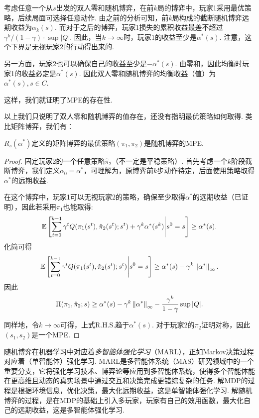考虑任意一个从$s$出发的双人零和随机博弈，在前$k$局的博弈中，玩家1采用最优策略，后续局面可选择任意动作. 由之前的分析可知，前$k$局构成的截断随机博弈远期收益为$\alpha_k(s)$. 而对于之后的博弈，玩家1损失的累积收益最差不超过$\gamma^k/(1-\gamma)\cdot \sup|Q|$. 因此，当$k\to\infty$时，玩家$1$的收益至少是$\alpha^*(s)$. 注意，这个下界是无视玩家2的行动得出来的.

另一方面，玩家2也可以确保自己的收益至少是$-\alpha^*(s)$. 由零和，因此均衡时玩家1的收益必定是$\alpha^*(s)$. 因此双人零和随机博弈的均衡收益（值）为$\alpha^*(s),s\in C$.

这样，我们就证明了MPE的存在性. 

以上我们只说明了双人零和随机博弈的值存在，还没有指明最优策略如何取得. 类比矩阵博弈，我们有：
\begin{theorem}
$R_s(\alpha^*)$定义的矩阵博弈的最优策略$(\pi_1,\pi_2)$是随机博弈的MPE. 
\end{theorem}
\begin{proof}
固定玩家2的一个任意策略$\hat{\pi}_2$（不一定是平稳策略）. 首先考虑一个$k$阶段截断博弈，我们定义$\alpha_0=\alpha^*$，可理解为，原博弈前$k$步动作待定，后面使用策略取得$\alpha^*$的远期收益.

在这个博弈中，玩家1可以无视玩家2的策略，确保至少取得$\alpha^*$的远期收益（已证明），因此若采用$\pi_1$也能取得:
\[\mathbb{E}\left[\sum_{t=0}^{k-1}\gamma^tQ(\pi_1(s^t),\hat{\pi}_2(s^t);s^t)+\gamma^k\alpha^*(s^k)\middle|s^0=s\right]\geq \alpha^*(s).\]
化简可得
\[\mathbb{E}\left[\sum_{t=0}^{k-1}\gamma^tQ(\pi_1(s^t),\hat{\pi}_2(s^t);s^t)\middle|s^0=s\right]\geq \alpha^*(s)-\gamma^k\left\|\alpha^*\right\|_\infty.\]
因此
\[\Pi(\pi_1,\hat{\pi}_2;s)\geq \alpha^*(s) - \gamma^k\left\|\alpha^*\right\|_\infty - \frac{\gamma^k}{1-\gamma}\sup|Q|.\]

同样地，令$k\to\infty$可得，上式R.H.S.趋于$\alpha^*(s)$. 对于玩家2的$\pi_2$证明对称，因此$(s_1,s_2)$是一个MPE.
\end{proof}

随机博弈在机器学习中对应着\emph{多智能体强化学习}（MARL），正如Markov决策过程对应着（单智能体）强化学习. MARL是多智能体系统（MAS）研究领域中的一个重要分支，它将强化学习技术、博弈论等应用到多智能体系统，使得多个智能体能在更高维且动态的真实场景中通过交互和决策完成更错综复杂的任务. 解MDP的过程是根据环境信息，优化决策，最大化远期收益，这是单智能体强化学习. 解随机博弈的过程，是在MDP的基础上引入多玩家，玩家有自己的效用函数，最大化自己的远期收益，这是多智能体强化学习. 